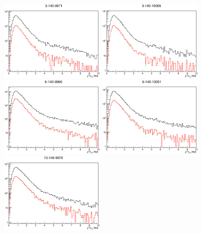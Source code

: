 \begin{figure}[!tbh]
    \centering
    \includegraphics*[width=0.45\textwidth]{analysis_plots/plots_3-140-full/chi2_tkd.eps}
    \includegraphics*[width=0.45\textwidth]{analysis_plots/plots_3-140-empty/chi2_tkd.eps}
    \includegraphics*[width=0.45\textwidth]{analysis_plots/plots_6-140-full/chi2_tkd.eps}
    \includegraphics*[width=0.45\textwidth]{analysis_plots/plots_6-140-empty/chi2_tkd.eps}
    \includegraphics*[width=0.45\textwidth]{analysis_plots/plots_10-140-full/chi2_tkd.eps}

\end{figure}
